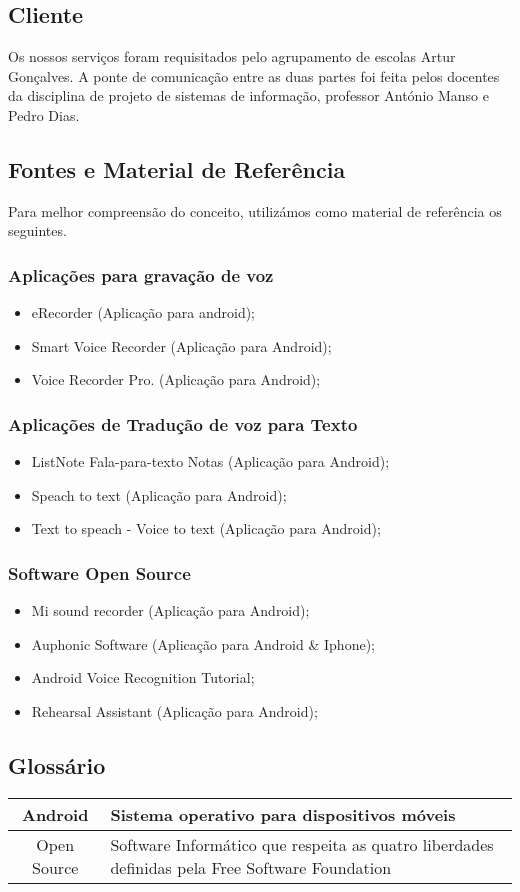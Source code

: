 \documentclass[a4paper,titlepage]{article}
\begin{document}
		\newpage
		\subsection{Cliente}
				Os nossos serviços foram requisitados pelo agrupamento de escolas Artur Gonçalves. A ponte de comunicação entre as duas partes foi feita pelos docentes da disciplina de projeto de sistemas de informação, professor António Manso e Pedro Dias. 
				
				\subsection{Fontes e Material de Referência}
				Para melhor compreensão do conceito, utilizámos como material de referência os seguintes.
				\subsubsection{Aplicações para gravação de voz} 
					\begin{itemize}
						\item eRecorder (Aplicação para android);
						\item Smart Voice Recorder (Aplicação para Android);
						\item Voice Recorder Pro. (Aplicação para Android);		
					\end{itemize} 
				\subsubsection{Aplicações de Tradução de voz para Texto}
					\begin{itemize}
						\item ListNote Fala-para-texto Notas (Aplicação para Android); 
						\item Speach to text (Aplicação para Android);
						\item Text to speach - Voice to text (Aplicação para Android);
					\end{itemize}
				\subsubsection{Software Open Source}
					\begin{itemize}
						\item Mi sound recorder (Aplicação para Android);
						\item Auphonic Software (Aplicação para Android \& Iphone);
						\item Android Voice Recognition Tutorial;
						\item Rehearsal Assistant (Aplicação para Android);
					\end{itemize}
				
				\subsection{Glossário}
				\begin{tabular}{|c|p{8cm}|}
				\hline Android & Sistema operativo para dispositivos móveis \\ 
				\hline Open Source  & Software Informático que respeita as quatro liberdades definidas pela Free Software Foundation \\ 
				\hline 
				\end{tabular} 
				
		
		
\end{document}
